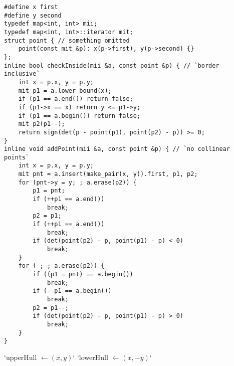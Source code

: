 \begin{lstlisting}
#define x first
#define y second
typedef map<int, int> mii;
typedef map<int, int>::iterator mit;
struct point { // something omitted
	point(const mit &p): x(p->first), y(p->second) {}
};
inline bool checkInside(mii &a, const point &p) { // `border inclusive`
	int x = p.x, y = p.y;
	mit p1 = a.lower_bound(x);
	if (p1 == a.end()) return false;
	if (p1->x == x)	return y <= p1->y;
	if (p1 == a.begin()) return false;
	mit p2(p1--);
	return sign(det(p - point(p1), point(p2) - p)) >= 0;
}
inline void addPoint(mii &a, const point &p) { // `no collinear points`
	int x = p.x, y = p.y;
	mit pnt = a.insert(make_pair(x, y)).first, p1, p2;
	for (pnt->y = y; ; a.erase(p2)) {
		p1 = pnt;
		if (++p1 == a.end())
			break;
		p2 = p1;
		if (++p1 == a.end())
			break;
		if (det(point(p2) - p, point(p1) - p) < 0)
			break;
	}
	for ( ; ; a.erase(p2)) {
		if ((p1 = pnt) == a.begin())
			break;
		if (--p1 == a.begin())
			break;
		p2 = p1--;
		if (det(point(p2) - p, point(p1) - p) > 0)
			break;
	}
}
\end{lstlisting}
`upperHull $\leftarrow (x, y)$`
`lowerHull $\leftarrow (x, -y)$`
